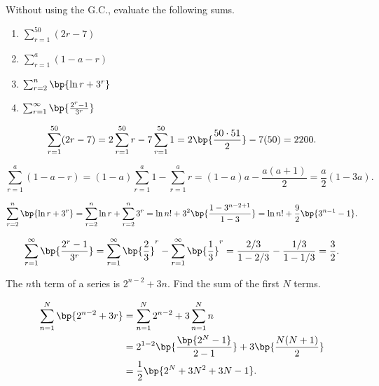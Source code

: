 \begin{problem}
    Without using the G.C., evaluate the following sums.

    \begin{enumerate}
        \item $\sum_{r=1}^{50} (2r-7)$
        \item $\sum_{r=1}^a (1-a-r)$
        \item $\sum_{r=2}^n \bp{\ln r + 3^r}$
        \item $\sum_{r=1}^\infty \bp{\frac{2^r-1}{3^r}}$
    \end{enumerate}
\end{problem}
\begin{solution}
    \begin{ppart}
        \[\sum_{r=1}^{50} (2r-7) = 2\sum_{r=1}^{50} r - 7 \sum_{r=1}^{50} 1 = 2 \bp{\frac{50 \cdot 51}2} - 7(50) = 2200.\]
    \end{ppart}
    \begin{ppart}
        \[\sum_{r=1}^a (1-a-r) = (1-a)\sum_{r=1}^a 1 - \sum_{r=1}^a r = (1-a) a - \frac{a(a+1)}2 = \frac{a}2 (1-3a).\]
    \end{ppart}
    \begin{ppart}
        \[\sum_{r=2}^n \bp{\ln r + 3^r} = \sum_{r=2}^n \ln r + \sum_{r=2}^n 3^r = \ln n! + 3^2 \bp{\frac{1 - 3^{n-2+1}}{1-3}} = \ln n! +\frac92 \bp{3^{n-1} - 1}.\]
    \end{ppart}
    \begin{ppart}
        \[\sum_{r=1}^\infty \bp{\frac{2^r-1}{3^r}} = \sum_{r=1}^\infty \bp{\frac23}^r - \sum_{r=1}^\infty \bp{\frac1{3}}^r = \frac{2/3}{1-2/3} - \frac{1/3}{1- 1/3} = \frac32.\]
    \end{ppart}
\end{solution}

\begin{problem}
    The $n$th term of a series is $2^{n-2} + 3n$. Find the sum of the first $N$ terms.
\end{problem}
\begin{solution}
    \begin{align*}
        \sum_{n = 1}^N \bp{2^{n-2} + 3r} &= \sum_{n = 1}^N 2^{n-2} + 3\sum_{n = 1}^N n\\
        &= 2^{1-2} \bp{\frac{\bp{2^N - 1}}{2-1}} + 3\bp{\frac{N(N+1)}2}\\
        &= \frac12 \bp{2^N + 3N^2 + 3N - 1}.
    \end{align*}
\end{solution}

